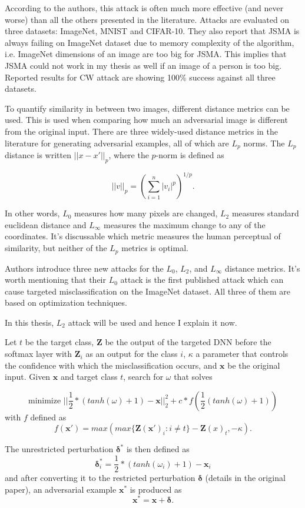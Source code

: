 According to the authors, this attack is often much more effective (and never worse) than all the others presented in the literature. Attacks are evaluated on three datasets: ImageNet, MNIST and CIFAR-10. They also report that JSMA is always failing on ImageNet dataset due to memory complexity of the algorithm, i.e. ImageNet dimensions of an image are too big for JSMA. This implies that JSMA could not work in my thesis as well if an image of a person is too big. Reported results for CW attack are showing 100\% success against all three datasets.


To quantify similarity in between two images, different distance metrics can be used. This is used when comparing how much an adversarial image is different from the original input. There are three widely-used distance metrics in the literature for generating adversarial examples, all of which are $L_p$ norms. The $L_p$ distance is written $||x - x'||_p$, where the $p$-norm is defined as

\[
||v||_p =( \sum_{i = 1}^{n} |v_i|^p)^{1/p}. 
\]

In other words, $L_0$ measures how many pixels are changed, $L_2$ measures standard euclidean distance and $L_\infty$ measures the maximum change to any of the coordinates. It's discussable which metric measures the human perceptual of similarity, but neither of the $L_p$ metrics is optimal.


Authors introduce three new attacks for the $L_0$, $L_2$, and $L_{ \infty }$ distance metrics. It's worth mentioning that their $L_0$ attack is the first published attack which can cause targeted misclassification on the ImageNet dataset. All three of them are based on optimization techniques.

In this thesis, $L_2$ attack will be used and hence I explain it now.

Let $t$ be the target class, $\pmb Z$ be the output of the targeted DNN before the softmax layer with $\pmb Z_i$ as an output for the class $i$, $\kappa$ a parameter that controls the confidence with which the misclassification occurs, and $\pmb x$ be the original input.
Given $\pmb x$ and target class $t$, search for $\omega$ that solves

\[
\text{minimize } ||\frac{1}{2}*(tanh(\omega) + 1) - \pmb x||_2^2 + c * f(\frac{1}{2}(tanh(\omega) + 1))
\]
with $f$ defined as 
\[
f(\pmb x') = max(max\{\pmb Z(\pmb x ')_i : i \neq t\} - \pmb Z(x)_t, - \kappa).
\]

The unrestricted perturbation $\pmb \delta^*$ is then defined as 
\[
	\pmb \delta^*_i = \frac{1}{2} * (tanh ( \omega_i) + 1) - \pmb x_i
\]
and after converting it to the restricted perturbation $\pmb \delta$ (details in the original paper), an adversarial example $\pmb x^*$ is produced as 
\[
\pmb x^* = \pmb x +\pmb  \delta.
\]


 






